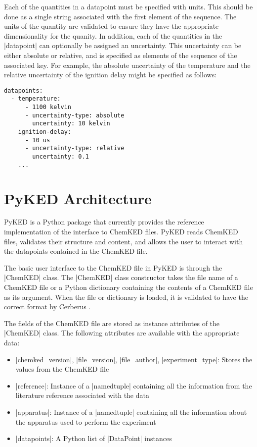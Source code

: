 \documentclass[12pt]{ussci}
\newcommand\ck{ChemKED}
\newcommand\pk{PyKED}
\begin{document}
Each of the quantities in a datapoint must be specified with units. This should
be done as a single string associated with the first element of the sequence.
The units of the quantity are validated to ensure they have the appropriate
dimensionality for the quanity. In addition, each of the quantities in the
\yaml|datapoint| can optionally be assigned an uncertainty. This uncertainty can
be either absolute or relative, and is specified as elements of the sequence of
the associated key. For example, the absolute uncertainty of the temperature and
the relative uncertainty of the ignition delay might be specified as follows:

\begin{verbatim}
datapoints:
  - temperature:
      - 1100 kelvin
      - uncertainty-type: absolute
        uncertainty: 10 kelvin
    ignition-delay:
      - 10 us
      - uncertainty-type: relative
        uncertainty: 0.1
    ...
\end{verbatim}

\section{PyKED Architecture}
%
\pk{} is a Python package that currently provides the reference implementation
of the interface to \ck{} files. \pk{} reads \ck{} files, validates their
structure and content, and allows the user to interact with the datapoints
contained in the \ck{} file.

The basic user interface to the \ck{} file in \pk{} is through the
\python|ChemKED| class. The \python|ChemKED| class constructor takes the file
name of a \ck{} file or a Python dictionary containing the contents of a \ck{}
file as its argument. When the file or dictionary is loaded, it is validated to
have the correct format by Cerberus \autocite{cerberus}.

The fields of the \ck{} file are stored as instance attributes of the
\python|ChemKED| class. The following attributes are available with the
appropriate data:
%
\begin{itemize}
    \item \python|chemked_version|, \python|file_version|, \python|file_author|,
    \python|experiment_type|: Stores the values from the \ck{} file
    \item \python|reference|: Instance of a \python|namedtuple| containing all
    the information from the literature reference associated with the data
    \item \python|apparatus|: Instance of a \python|namedtuple| containing all
    the information about the apparatus used to perform the experiment
    \item \python|datapoints|: A Python list of \python|DataPoint| instances
\end{itemize}
\end{document}
